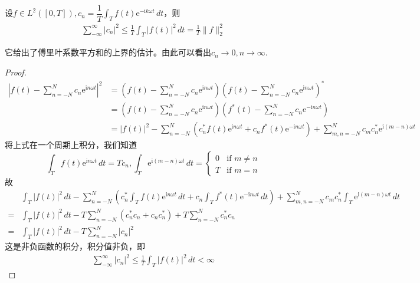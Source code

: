 \begin{lemma}[贝塞尔不等式]
设$ f\in L^2([0,T]),c_n=\dfrac{1}{T}\int_{T}f(t)\mathrm{e}^{-\mathrm{i}k\omega t}\,dt$，则
\begin{align*}
    \sum_{-\infty}^{\infty}|c_n|^2\leq \frac{1}{T}\int_{T}|f(t)|^2\,dt=\frac{1}{T}\|f\|_2^2
\end{align*}
\end{lemma}
它给出了傅里叶系数平方和的上界的估计。由此可以看出$c_n\to 0,n\to\infty$.
\begin{proof}
    \begin{align*}
    \left|f(t)-\sum_{n=-N}^{N}c_n \mathrm{e}^{\mathrm{i}n\omega t}\right|^2 & =\left(f(t)-\sum_{n=-N}^{N}c_n \mathrm{e}^{\mathrm{i}n\omega t}\right)\left(f(t)-\sum_{n=-N}^{N}c_n \mathrm{e}^{\mathrm{i}n\omega t}\right)^*\\
    & =\left(f(t)-\sum_{n=-N}^{N}c_n \mathrm{e}^{\mathrm{i}n\omega t}\right)\left(f^*(t)-\sum_{n=-N}^{N}c_n \mathrm{e}^{-\mathrm{i}n\omega t}\right)\\
    & =|f(t)|^2-\sum_{n=-N}^{N}\left(c_n^*f(t)\mathrm{e}^{\mathrm{i}n\omega t}+c_n f^*(t)\mathrm{e}^{-\mathrm{i}n\omega t}\right)+\sum_{m,n=-N}^{N}c_m c_n^*\mathrm{e}^{\mathrm{i}(m-n)\omega t}
\end{align*}
将上式在一个周期上积分，我们知道
\[\int_{T}f(t)\mathrm{e}^{\mathrm{i}n\omega t}\,dt=Tc_n,\int_{T}\mathrm{e}^{\mathrm{i}(m-n)\omega t}\,dt=\begin{cases}
        0 & \text{if }m\neq n \\
        T & \text{if }m=n
    \end{cases}\]
故\begin{align*}
      & \int_{T}|f(t)|^2\,dt-\sum_{n=-N}^{N}\left(c_n^*\int_{T}f(t)\mathrm{e}^{\mathrm{i}n\omega t}\,dt+c_n \int_{T}f^*(t)\mathrm{e}^{-\mathrm{i}n\omega t}\,dt\right)+\sum_{m,n=-N}^{N}c_m c_n^*\int_{T}\mathrm{e}^{\mathrm{i}(m-n)\omega t}\,dt \\
    = & \int_{T}|f(t)|^2\,dt-T\sum_{n=-N}^{N}(c_n^* c_n+c_n c_n^*)+T\sum_{n=-N}^{N}c_n^* c_n\\
    = & \int_{T}|f(t)|^2\,dt-T\sum_{n=-N}^{N}|c_n|^2
\end{align*}
这是非负函数的积分，积分值非负，即\begin{align*}
    \sum_{-\infty}^{\infty}|c_n|^2\leq \frac{1}{T}\int_{T}|f(t)|^2\,dt<\infty
\end{align*}
\end{proof}


